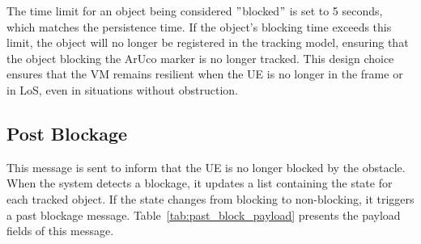\begin{table}[H]
    \caption{Components of the Blockage payload.}
    \label{tab:block_payload}
    \centering
\end{table}

The time limit for an object being considered \("\)blocked\("\) is set to 5 seconds, which matches the persistence time.
If  the object's blocking time exceeds this limit, the object will no longer be registered in the tracking model, ensuring that the object blocking the ArUco marker is no longer tracked.
This design choice ensures that the VM remains resilient when the UE is no longer in the frame or in LoS, even in situations without obstruction.


\subsection{Post Blockage}\label{subsec:past-blockage}
This message is sent to inform that the UE is no longer blocked by the obstacle.
When the system detects a blockage, it updates a list containing the state for each tracked object.
If the state changes from blocking to non-blocking, it triggers a past blockage message.
Table~\ref{tab:past_block_payload} presents the payload fields of this message.


